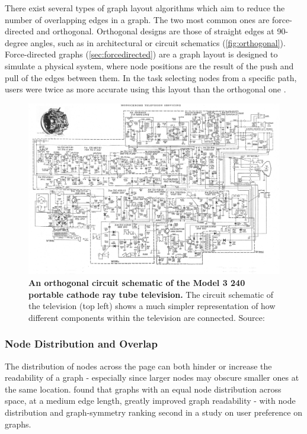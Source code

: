 There exist several types of graph layout algorithms which aim to reduce the number of overlapping edges in a graph. The two most common ones are force-directed and orthogonal. Orthogonal designs are those of straight edges at 90-degree angles, such as in architectural or circuit schematics (\autoref{fig:orthogonal}). Force-directed graphs (\autoref{sec:forcedirected}) are a graph layout is designed to simulate a physical system, where node positions are the result of the push and pull of the edges between them. In the task selecting nodes from a specific path, users were twice as more accurate using this layout than the orthogonal one \citep{eyetrack}.


\begin{figure}[H]
    \centering
        \includegraphics[width=\textwidth]{tvschematic.jpg}
       \caption{\textbf{An orthogonal circuit schematic of the Model 3 240 portable cathode ray tube television.} The circuit schematic of the television (top left) shows a much simpler representation of how different components within the television are connected.  Source: \citep{orthogonaltv} }
       \label{fig:orthogonal}
\end{figure}





\subsubsection{Node Distribution and Overlap}\label{sec:ndist}

The distribution of nodes across the page can both hinder or increase the readability of a graph - especially since larger nodes may obscure smaller ones at the same location. \cite{ch6graphredability} found that graphs with an equal node distribution across space, at a medium edge length, greatly improved graph readability - with node distribution and graph-symmetry ranking second in a study on user preference on graphs.

